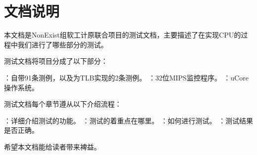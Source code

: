 \chapter{文档说明}

本文档是NonExist组软工计原联合项目的测试文档，主要描述了在实现CPU的过程中我们进行了哪些部分的测试。

测试文档将项目分成了以下部分：

    \begin{enumerate}
        ：自带91条测例，以及为TLB实现的2条测例。
        ：32位MIPS监控程序。
        ：uCore操作系统。
    \end{enumerate}


测试文档每个章节遵从以下介绍流程：

    \begin{enumerate}
        ：详细介绍测试的功能。
        ：测试的着重点在哪里。
        ：如何进行测试。
        ：测试结果是否正确。
    \end{enumerate}

希望本文档能给读者带来裨益。

